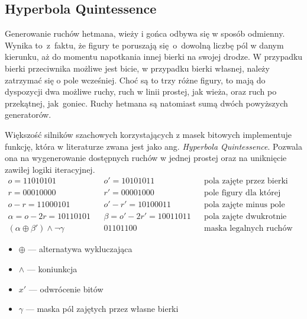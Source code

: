 \subsection{Hyperbola Quintessence}
\label{subsec:hyperbola-quintessence}

Generowanie ruchów hetmana, wieży i gońca odbywa się w sposób odmienny.
Wynika to~z~faktu, że figury te poruszają się~o~dowolną liczbę pól w danym kierunku, aż do momentu napotkania innej bierki na swojej drodze.
W przypadku bierki przeciwnika możliwe jest bicie, w przypadku bierki własnej, należy zatrzymać się o pole wcześniej.
Choć są to trzy różne figury, to mają do dyspozycji dwa możliwe ruchy, ruch w linii prostej, jak wieża, oraz ruch po przekątnej, jak~goniec.
Ruchy hetmana są natomiast sumą dwóch powyższych generatorów.

Większość silników szachowych korzystających z masek bitowych implementuje funkcję, która w literaturze zwana jest jako ang. \emph{Hyperbola Quintessence}.
Pozwala ona na wygenerowanie dostępnych ruchów w jednej prostej oraz na uniknięcie zawiłej logiki iteracyjnej.
\begin{align*}
    o = \text{11010101} && o' = \text{10101011} && \text{pola zajęte przez bierki} \\
    r = \text{00010000} && r' = \text{00001000} && \text{pole figury dla której generujemy ruchy} \\
    o-r = \text{11000101} && o'-r' = \text{10100011} && \text{pola zajęte minus pole figury} \\
    \alpha = o-2r = \text{10110101} && \beta = o'-2r' = \text{10011011} && \text{pola zajęte dwukrotnie minus pole figury} \\
    (\alpha \oplus \beta') \wedge \neg \gamma && \text{01101100} && \text{maska legalnych ruchów}
\end{align*}
\begin{multicols}{2}
    \begin{itemize}[label={}]
        \item \(\oplus\) — alternatywa wykluczająca
        \item \(\wedge\) — koniunkcja
        \item \(x'\) — odwrócenie bitów
        \item \(\gamma\) — maska pól zajętych przez własne bierki
    \end{itemize}
\end{multicols}




